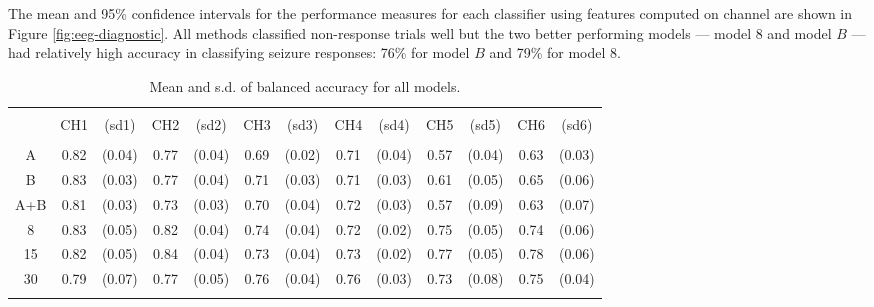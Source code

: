 The mean and 95\% confidence intervals for the 
performance measures for each classifier using features
computed on channel are shown in Figure \ref{fig:eeg-diagnostic}.
All methods classified non-response trials well but the two better performing
 models --- model 8  and model $B$ --- 
had relatively high accuracy in classifying seizure responses: 76\% for model $B$ and 79\% for model 8. 

\begin{table}[!htbp] \centering 
\begin{tabular}{@{\extracolsep{-5pt}} ccccccccccccc} 
\\[-1.8ex]\hline 
\hline \\[-1.8ex] 
 & CH1 & (sd1) & CH2 & (sd2) & CH3 & (sd3) & CH4 & (sd4) & CH5 & (sd5) & CH6 & (sd6) \\ 
\hline \\[-1.8ex] 
A & 0.82 & (0.04) & 0.77 & (0.04) & 0.69 & (0.02) & 0.71 & (0.04) & 0.57 & (0.04) & 0.63 & (0.03) \\ 
B & 0.83 & (0.03) & 0.77 & (0.04) & 0.71 & (0.03) & 0.71 & (0.03) & 0.61 & (0.05) & 0.65 & (0.06) \\ 
A+B & 0.81 & (0.03) & 0.73 & (0.03) & 0.70 & (0.04) & 0.72 & (0.03) & 0.57 & (0.09) & 0.63 & (0.07) \\ 
8 & 0.83 & (0.05) & 0.82 & (0.04) & 0.74 & (0.04) & 0.72 & (0.02) & 0.75 & (0.05) & 0.74 & (0.06) \\ 
15 & 0.82 & (0.05) & 0.84 & (0.04) & 0.73 & (0.04) & 0.73 & (0.02) & 0.77 & (0.05) & 0.78 & (0.06) \\ 
30 & 0.79 & (0.07) & 0.77 & (0.05) & 0.76 & (0.04) & 0.76 & (0.03) & 0.73 & (0.08) & 0.75 & (0.04) \\ 
\hline \\[-1.8ex] 
\end{tabular} 
  \caption{Mean and s.d. of balanced accuracy for all models.} 
  \label{tab:all-accuracy} 
\end{table} 
